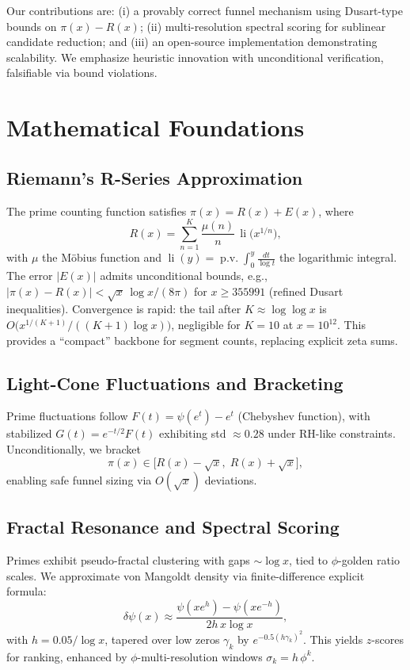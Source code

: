 \documentclass[11pt]{article}
\DeclareMathOperator{\li}{li}
\DeclareMathOperator{\pv}{p.v.}
\begin{document}
Our contributions are: (i) a provably correct funnel mechanism using Dusart-type bounds on $\pi(x) - R(x)$; (ii) multi-resolution spectral scoring for sublinear candidate reduction; and (iii) an open-source implementation demonstrating scalability. We emphasize heuristic innovation with unconditional verification, falsifiable via bound violations.

\section{Mathematical Foundations}

\subsection{Riemann's R-Series Approximation}
The prime counting function satisfies $\pi(x) = R(x) + E(x)$, where
\[
R(x) = \sum_{n=1}^{K} \frac{\mu(n)}{n}\,\li\!\big(x^{1/n}\big),
\]
with $\mu$ the M\"obius function and $\li(y) = \pv\!\int_0^y \frac{dt}{\log t}$ the logarithmic integral. The error $|E(x)|$ admits unconditional bounds, e.g., $|\pi(x) - R(x)| < \sqrt{x}\,\log x/(8\pi)$ for $x \ge 355991$ (refined Dusart inequalities). Convergence is rapid: the tail after $K \approx \log\log x$ is $O\!\big(x^{1/(K+1)} / ((K{+}1)\log x)\big)$, negligible for $K{=}10$ at $x{=}10^{12}$. This provides a ``compact'' backbone for segment counts, replacing explicit zeta sums.

\subsection{Light-Cone Fluctuations and Bracketing}
Prime fluctuations follow $F(t) = \psi(e^t) - e^t$ (Chebyshev function), with stabilized $G(t) = e^{-t/2} F(t)$ exhibiting std $\approx 0.28$ under RH-like constraints. Unconditionally, we bracket
\[
\pi(x) \in \big[R(x) - \sqrt{x},\; R(x) + \sqrt{x}\big],
\]
enabling safe funnel sizing via $O(\sqrt{x})$ deviations.

\subsection{Fractal Resonance and Spectral Scoring}
Primes exhibit pseudo-fractal clustering with gaps $\sim \log x$, tied to $\phi$-golden ratio scales. We approximate von Mangoldt density via finite-difference explicit formula:
\[
\delta\psi(x) \approx \frac{\psi(x e^{h}) - \psi(x e^{-h})}{2 h\, x \log x},
\]
with $h = 0.05/\log x$, tapered over low zeros $\gamma_k$ by $e^{-0.5 (h \gamma_k)^2}$. This yields $z$-scores for ranking, enhanced by $\phi$-multi-resolution windows $\sigma_k = h \,\phi^k$.
\end{document}
